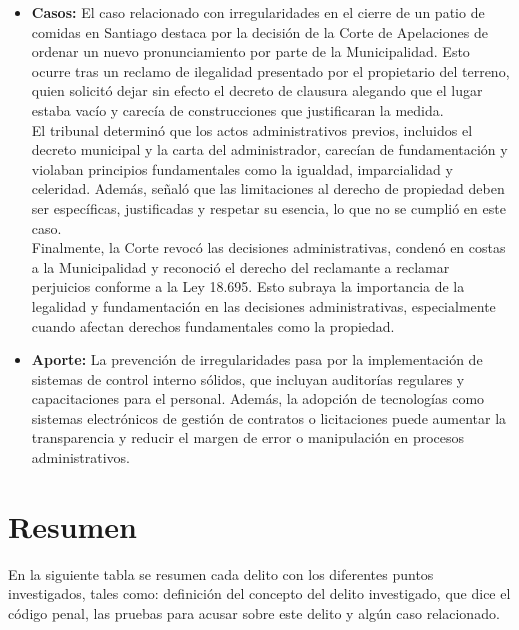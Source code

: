 \documentclass[letter,12pt]{article}
\begin{document}
\begin{itemize}
		\item \textbf{Casos: }El caso relacionado con irregularidades en el cierre de un patio de comidas en Santiago destaca por la decisión de la Corte de Apelaciones de ordenar un nuevo pronunciamiento por parte de la Municipalidad. Esto ocurre tras un reclamo de ilegalidad presentado por el propietario del terreno, quien solicitó dejar sin efecto el decreto de clausura alegando que el lugar estaba vacío y carecía de construcciones que justificaran la medida.\\ El tribunal determinó que los actos administrativos previos, incluidos el decreto municipal y la carta del administrador, carecían de fundamentación y violaban principios fundamentales como la igualdad, imparcialidad y celeridad. Además, señaló que las limitaciones al derecho de propiedad deben ser específicas, justificadas y respetar su esencia, lo que no se cumplió en este caso.\\ Finalmente, la Corte revocó las decisiones administrativas, condenó en costas a la Municipalidad y reconoció el derecho del reclamante a reclamar perjuicios conforme a la Ley 18.695. Esto subraya la importancia de la legalidad y fundamentación en las decisiones administrativas, especialmente cuando afectan derechos fundamentales como la propiedad.\cite{Irregularidades}\\
		
		\item \textbf{Aporte: }La prevención de irregularidades pasa por la implementación de sistemas de control interno sólidos, que incluyan auditorías regulares y capacitaciones para el personal. Además, la adopción de tecnologías como sistemas electrónicos de gestión de contratos o licitaciones puede aumentar la transparencia y reducir el margen de error o manipulación en procesos administrativos.\\
	\end{itemize}
	\newpage
	\section{Resumen}
	En la siguiente tabla se resumen cada delito con los diferentes puntos investigados, tales como: definición del concepto del delito investigado, que dice el código penal, las pruebas para acusar sobre este delito y algún caso relacionado.
	
\end{document}
